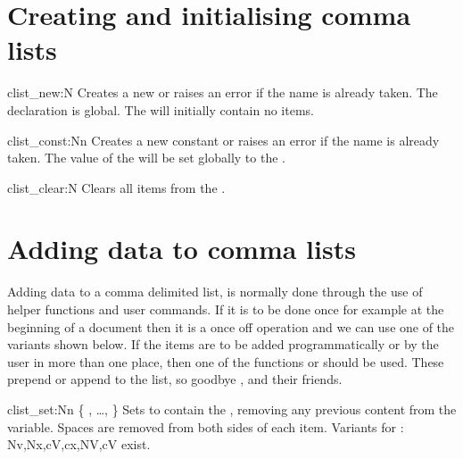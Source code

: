  \section{Creating and initialising comma lists}

 \begin{docCommand}{clist_new:N}{ }
   Creates a new  or raises an error if the name is
   already taken. The declaration is global. The  will
   initially contain no items.
 \end{docCommand}


\begin{docCommand}{clist_const:Nn}{  }
   Creates a new constant  or raises an error
   if the name is already taken. The value of the
    will be set globally to the
   .
 \end{docCommand}

\begin{docCommand}{clist_clear:N}{ }
   Clears all items from the .
\end{docCommand}

 \section{Adding data to comma lists}

Adding data to a comma delimited list, is normally done through the use of helper functions and user commands.
If it is to be done once for example at the beginning of a document then it is a once off operation and we can use one of the  variants shown below. If the items are to be added programmatically or by the user in more than one place, then one of the functions  or  should be used. These prepend or append to the list, so goodbye ,  and their friends. 



  \begin{docCommand}{clist_set:Nn}{%
       \{
      ,
      \ldots,
      \}
      }
   Sets  to contain the ,
   removing any previous content from the variable.
   Spaces are removed from both sides of each item. Variants for : Nv,Nx,cV,cx,NV,cV exist.
 \end{docCommand}

